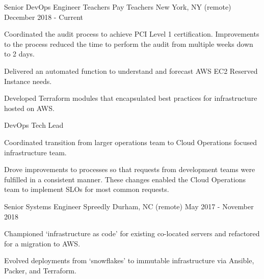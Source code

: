 

\begin{cventries}

  \cventry
    {Senior DevOps Engineer} %
    {Teachers Pay Teachers} %
    {New York, NY (remote)} %
    {December 2018 - Current} %
    { 
      \begin{cvitems} %
        \item {Coordinated the audit process to achieve PCI Level 1 certification. Improvements to the process reduced the time to perform the audit from multiple weeks down to 2 days.}
        \item {Delivered an automated function to understand and forecast AWS EC2 Reserved Instance needs.}
        \item {Developed Terraform modules that encapsulated best practices for infrastructure hosted on AWS.}
      \end{cvitems}
    }

  \cventry
    {DevOps Tech Lead} %
    {} %
    {} %
    {}
    {
      \begin{cvitems} %
        \item {Coordinated transition from larger operations team to Cloud Operations focused infrastructure team.}
        \item {Drove improvements to processes so that requests from development teams were fulfilled in a consistent manner. These changes enabled the Cloud Operations team to implement SLOs for most common requests.}
      \end{cvitems}
    }

  \cventry
    {Senior Systems Engineer} %
    {Spreedly} %
    {Durham, NC (remote)} %
    {May 2017 - November 2018} %
    {
      \begin{cvitems} %
        \item {Championed `infrastructure as code' for existing co-located servers and refactored for a migration to AWS.}
        \item {Evolved deployments from `snowflakes' to immutable infrastructure via Ansible, Packer, and Terraform.}
      \end{cvitems}
    }


\end{cventries}

